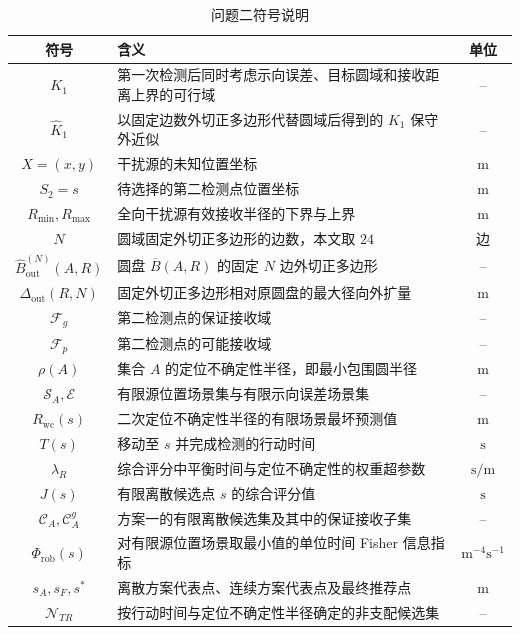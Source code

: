 \documentclass[withoutpreface,bwprint]{cumcmthesis}
\begin{document}
\begin{table}[H]
  \centering
  \caption{问题二符号说明}
  \label{tab:q2-symbols}
  \begin{tabularx}{0.94\textwidth}{@{}cXc@{}}
    \toprule
    符号 & 含义 & 单位 \\
    \midrule
    $K_1$ & 第一次检测后同时考虑示向误差、目标圆域和接收距离上界的可行域 & -- \\
    $\widehat K_1$ & 以固定边数外切正多边形代替圆域后得到的 $K_1$ 保守外近似 & -- \\
    $X=(x,y)$ & 干扰源的未知位置坐标 & $\mathrm{m}$ \\
    $S_2=s$ & 待选择的第二检测点位置坐标 & $\mathrm{m}$ \\
    $R_{\min},R_{\max}$ & 全向干扰源有效接收半径的下界与上界 & $\mathrm{m}$ \\
    $N$ & 圆域固定外切正多边形的边数，本文取 $24$ & 边 \\
    $\widehat B_{\mathrm{out}}^{(N)}(A,R)$ & 圆盘 $\overline B(A,R)$ 的固定 $N$ 边外切正多边形 & -- \\
    $\Delta_{\mathrm{out}}(R,N)$ & 固定外切正多边形相对原圆盘的最大径向外扩量 & $\mathrm{m}$ \\
    $\mathcal F_g$ & 第二检测点的保证接收域 & -- \\
    $\mathcal F_p$ & 第二检测点的可能接收域 & -- \\
    $\rho(A)$ & 集合 $A$ 的定位不确定性半径，即最小包围圆半径 & $\mathrm{m}$ \\
    $\mathcal S_A,\mathcal E$ & 有限源位置场景集与有限示向误差场景集 & -- \\
    $R_{\mathrm{wc}}(s)$ & 二次定位不确定性半径的有限场景最坏预测值 & $\mathrm{m}$ \\
    $T(s)$ & 移动至 $s$ 并完成检测的行动时间 & $\mathrm{s}$ \\
    $\lambda_R$ & 综合评分中平衡时间与定位不确定性的权重超参数 & $\mathrm{s/m}$ \\
    $J(s)$ & 有限离散候选点 $s$ 的综合评分值 & $\mathrm{s}$ \\
    $\mathcal C_A,\mathcal C_A^g$ & 方案一的有限离散候选集及其中的保证接收子集 & -- \\
    $\Phi_{\mathrm{rob}}(s)$ & 对有限源位置场景取最小值的单位时间 Fisher 信息指标 & $\mathrm{m}^{-4}\mathrm{s}^{-1}$ \\
    $s_A,s_F,s^*$ & 离散方案代表点、连续方案代表点及最终推荐点 & $\mathrm{m}$ \\
    $\mathcal N_{TR}$ & 按行动时间与定位不确定性半径确定的非支配候选集 & -- \\
    \bottomrule
  \end{tabularx}
\end{table}
\end{document}
